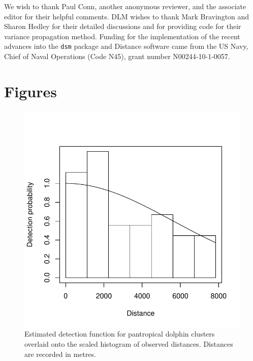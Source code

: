 \documentclass[a4paper,12pt]{article}
\begin{document}
We wish to thank Paul Conn, another anonymous reviewer, and the associate editor for their helpful comments. DLM wishes to thank Mark Bravington and Sharon Hedley for their detailed discussions and for providing code for their variance propagation method. Funding for the implementation of the recent advances into the \texttt{dsm} package and Distance software came from the US Navy, Chief of Naval Operations (Code N45), grant number \mbox{N00244-10-1-0057}.

\newpage




\newpage


\newpage


\section*{Figures}

\begin{figure}[h!]
  \caption{Estimated detection function for pantropical dolphin clusters overlaid onto the scaled histogram of observed distances. Distances are recorded in metres.}
  \label{dolphin-df}
  \begin{center}
    \includegraphics[width=\textwidth]{distances}
  \end{center}
\end{figure}
\end{document}
